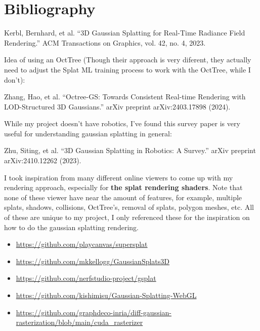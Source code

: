 \documentclass {article}
\begin{document}
\section{Bibliography}
     Kerbl, Bernhard, et al. “3D Gaussian Splatting for Real-Time Radiance Field Rendering.” ACM Transactions on Graphics, vol. 42, no. 4, 2023.

     Idea of using an OctTree (Though their approach is very diferent, they actually need to adjust the Splat ML training process to work with the OctTree, while I don't):

     Zhang, Hao, et al. “Octree-GS: Towards Consistent Real-time Rendering with LOD-Structured 3D Gaussians.” arXiv preprint arXiv:2403.17898 (2024).


     While my project doesn't have robotics, I've found this survey paper is very useful for understanding gaussian splatting in general:

     Zhu, Siting, et al. “3D Gaussian Splatting in Robotics: A Survey.” arXiv preprint arXiv:2410.12262 (2023).


     I took inspiration from many different online viewers to come up with my rendering approach, especially for \textbf{the splat rendering shaders}. Note that none of these viewer have near the amount of features, for example, multiple splats, shadows, collisions, OctTree's, removal of splats, polygon meshes, etc. All of these are unique to my project, I only referenced these for the inspiration on how to do the gaussian splatting rendering.
     \begin{itemize}
          \item \href{https://github.com/playcanvas/supersplat}{https://github.com/playcanvas/supersplat}
          \item \href{https://github.com/mkkellogg/GaussianSplats3D}{https://github.com/mkkellogg/GaussianSplats3D}
          \item \href{https://github.com/nerfstudio-project/gsplat}{https://github.com/nerfstudio-project/gsplat}
          \item \href{https://github.com/kishimisu/Gaussian-Splatting-WebGL}{https://github.com/kishimisu/Gaussian-Splatting-WebGL}
          \item \href{https://github.com/graphdeco-inria/diff-gaussian-rasterization/blob/main/cuda\_rasterizer}{https://github.com/graphdeco-inria/diff-gaussian-rasterization/blob/main/cuda\_rasterizer}
     \end{itemize}

\newpage
\end{document}

